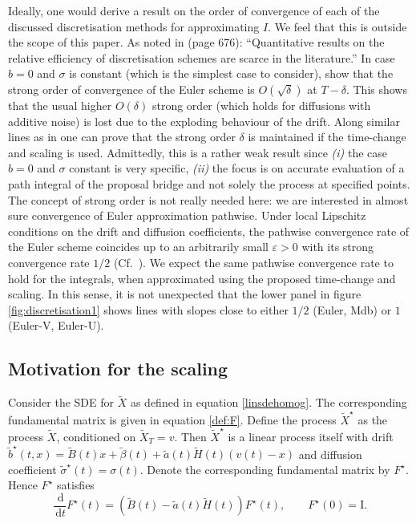 \documentclass[preprint]{imsart}
\newcommand{\si}{\sigma}
\newcommand{\eps}{\varepsilon}
\renewcommand{\tilde}{\widetilde}
\providecommand{\I}{\mathrm{I}}
\theoremstyle{definition}
\newcommand{\dd}{{\,\mathrm d}}
\begin{document}
Ideally, one would derive a result on the order of convergence of each of the discussed discretisation methods for approximating $I$. We feel that this is outside the scope of this paper. As noted in \cite{PapaRobertsStramer} (page 676): ``Quantitative results on the relative efficiency of discretisation schemes are scarce in the literature.'' In case $b=0$ and $\si$ is constant (which is the simplest case to consider), \cite{PapaRobertsStramer} show that the strong order of convergence of the Euler scheme is $O(\sqrt{\delta})$ at $T-\delta$. This shows that the usual higher $O(\delta)$ strong order (which holds for diffusions with additive noise) is lost due to the exploding behaviour of the drift. 
Along similar lines as in \cite{PapaRobertsStramer}   one can prove that the strong order $\delta$ is maintained if the time-change and scaling is used. Admittedly, this is a rather weak result since {\it (i)} the case $b=0$ and $\si$ constant is very specific, {\it (ii)} the focus is on accurate evaluation of a path integral of the proposal bridge and not solely the process at specified points. The concept of strong order is not really needed here: we are interested in almost sure convergence of Euler approximation pathwise.   Under local Lipschitz conditions on the drift and diffusion coefficients, the pathwise convergence rate of the Euler scheme coincides up to an arbitrarily small $\eps>0$ with its strong convergence rate $1/2$ (Cf.\ \cite{Gyongy}). We expect the same pathwise convergence rate to hold for the integrals, when approximated using the proposed time-change and scaling.  In this sense, it is not unexpected that the lower panel in figure \ref{fig:discretisation1} shows lines with  slopes close to either $1/2$ (Euler, Mdb) or $1$ (Euler-V, Euler-U). 
 

\subsection{Motivation for the scaling}\label{sec:motivation-scaling}
Consider the SDE for $\tilde{X}$ as defined in equation \eqref{linsdehomog}. The corresponding fundamental matrix is given in equation \eqref{def:F}. 
Define the process $\tilde{X}^\star$ as the process $\tilde{X}$, conditioned on $\tilde X_T = v$. Then $\tilde{X}^\star$ is a linear process itself with drift  $\tilde b^\star(t,x) = \tilde{B}(t) x + \tilde\beta(t) + \tilde{a}(t) \tilde{H}(t)  (v(t) -x)$ and diffusion coefficient $\tilde{\si}^\star(t)=\si(t)$.  
Denote the corresponding fundamental matrix  by $F^\star$. Hence $F^\star$ satisfies
\[
\frac{\dd }{\dd t} {F^\star}(t) =  \left( \tilde{B}(t)  - \tilde a(t) \tilde H(t)\right) F^\star(t),\qquad F^\star(0)=\I.
\]
\end{document}
